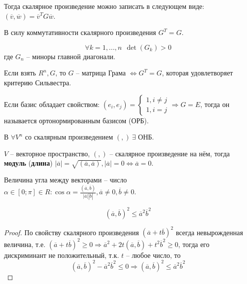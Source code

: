 	  Тогда скалярное произведение можно записать в следующем виде: $(\overline{v}, \overline{w}) = \overline{v}^T G \overline{w}$.
  
	  В силу коммутативности скалярного произведения $G^T = G$.
	  
	  \begin{Thm}
		 \[\forall k = 1,..., n \ \ \det(G_k) > 0\]
		 где $G_n$ -- миноры главной диагонали.
	  \end{Thm}
  
	  \begin{Prop}
		  Если взять $R^n, G$, то $G$ -- матрица Грама $\Leftrightarrow G^T = G$, которая удовлетворяет критерию Сильвестра.
	  \end{Prop}
  
	  \begin{Def}
		  Если базис обладает свойством:
		  $(e_i, e_j) = \begin{cases}
		  1, i \neq j\\
		  1, i = j
	  \end{cases} \Rightarrow G = E$,
	  тогда он называется ортонормированным базисом (ОРБ).
	  \end{Def} 
  
	  \begin{Thm}
		  В $\forall V^n$ со скалярным произведением $(,) \ \exists$ ОНБ. 
	  \end{Thm}
  
	  \begin{Def}
		  $V$ -- векторное пространство, $(,)$ -- скалярное произведение на нём, тогда \textbf{модуль} (\textbf{длина}) $|\overline{a}| = \sqrt{(\overline{a}, \overline{a})}, |\overline{a}| = 0 \Leftrightarrow \overline{a} = 0$.
	  \end{Def}
	  
	  \begin{Def}
		  Величина угла между векторами -- число $\alpha \in [0; \pi] \in R: \cos \alpha = \frac{(\overline{a}, \overline{b})}{|\overline{a}||\overline{b}|}, \overline{a} \neq 0, \overline{b} \neq 0$.
	  \end{Def}
  
	  \begin{Thm}
		  $$(\overline{a}, \overline{b})^2 \leqslant \overline{a}^2 \overline{b}^2$$
	  \end{Thm}
  
	  \begin{proof}
		  По свойству скалярного произведения $(\overline{a} + t\overline{b})^2$ всегда невырожденная величина, т.е. $(\overline{a} + t\overline{b})^2 \geqslant 0 \Rightarrow \overline{a}^2 + 2t(\overline{a}, \overline{b}) + t^2 \overline{b}^2 \geqslant 0$, 
		  тогда его дискриминант не положительный, т.к. $t$ -- любое число, то $$(\overline{a}, \overline{b})^2 - \overline{a}^2 \overline{b}^2 \leqslant 0 \Rightarrow (\overline{a}, \overline{b})^2 \leqslant \overline{a}^2 \overline{b}^2$$
	  \end{proof}
  
